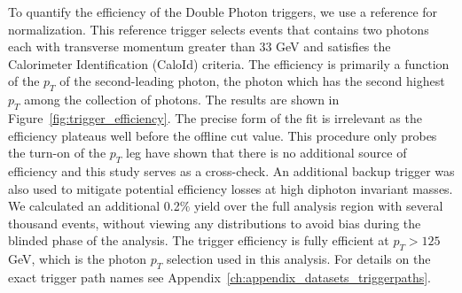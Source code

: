 To quantify the efficiency of the Double Photon triggers, we use a reference for normalization. This reference trigger selects events that contains two photons each with transverse momentum greater than 33 GeV and satisfies the Calorimeter Identification (CaloId) criteria. The efficiency is primarily a function of the $p_{T}$ of the second-leading photon, the photon which has the second highest $p_{T}$ among the collection of photons. The results are shown in Figure~\ref{fig:trigger_efficiency}. The precise form of the fit is irrelevant as the efficiency plateaus well before the offline cut value. This procedure only probes the turn-on of the $p_{T}$ leg \cite{ref:AN2016_167} have shown that there is no additional source of efficiency and this study serves as a cross-check. An additional backup trigger was also used to mitigate potential efficiency losses at high diphoton invariant masses. We calculated an additional 0.2$\%$ yield over the full analysis region with several thousand events, without viewing any distributions to avoid bias during the blinded phase of the analysis. The trigger efficiency is fully efficient at $p_T > 125$ GeV, which is the photon $p_{T}$ selection used in this analysis. For details on the exact trigger path names see Appendix~\ref{ch:appendix_datasets_triggerpaths}.




